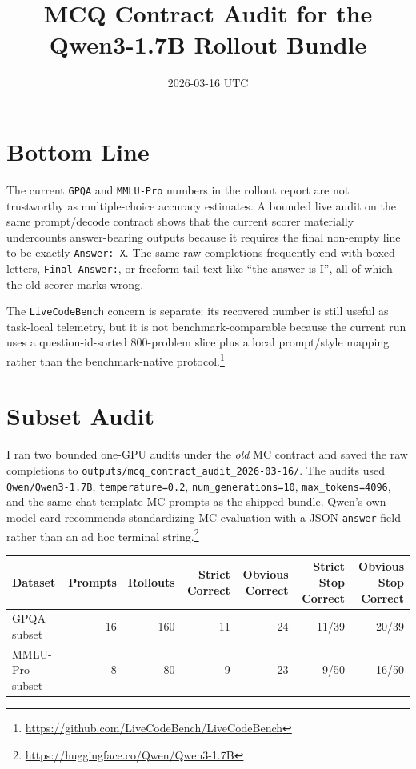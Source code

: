 \documentclass[11pt]{article}
\title{MCQ Contract Audit for the Qwen3-1.7B Rollout Bundle}
\date{2026-03-16 UTC}
\begin{document}
\maketitle

\section*{Bottom Line}
The current \texttt{GPQA} and \texttt{MMLU-Pro} numbers in the rollout report are
not trustworthy as multiple-choice accuracy estimates. A bounded live audit on the
same prompt/decode contract shows that the current scorer materially undercounts
answer-bearing outputs because it requires the final non-empty line to be exactly
\texttt{Answer: X}. The same raw completions frequently end with boxed letters,
\texttt{Final Answer:}, or freeform tail text like ``the answer is I'', all of which
the old scorer marks wrong.

The \texttt{LiveCodeBench} concern is separate: its recovered number is still useful as
task-local telemetry, but it is not benchmark-comparable because the current run uses
a question-id-sorted 800-problem slice plus a local prompt/style mapping rather than
the benchmark-native protocol.\footnote{\url{https://github.com/LiveCodeBench/LiveCodeBench}}

\section*{Subset Audit}
I ran two bounded one-GPU audits under the \emph{old} MC contract and saved the raw
completions to
\texttt{outputs/mcq\_contract\_audit\_2026-03-16/}. The audits used
\texttt{Qwen/Qwen3-1.7B}, \texttt{temperature=0.2}, \texttt{num\_generations=10},
\texttt{max\_tokens=4096}, and the same chat-template MC prompts as the shipped
bundle. Qwen's own model card recommends standardizing MC evaluation with a JSON
\texttt{answer} field rather than an ad hoc terminal string.\footnote{\url{https://huggingface.co/Qwen/Qwen3-1.7B}}

\begin{center}
\begin{tabular}{lrrrrrr}
\toprule
Dataset & Prompts & Rollouts & Strict Correct & Obvious Correct & Strict Stop Correct & Obvious Stop Correct \\
\midrule
GPQA subset & 16 & 160 & 11 & 24 & 11/39 & 20/39 \\
MMLU-Pro subset & 8 & 80 & 9 & 23 & 9/50 & 16/50 \\
\bottomrule
\end{tabular}
\end{center}
\end{document}
